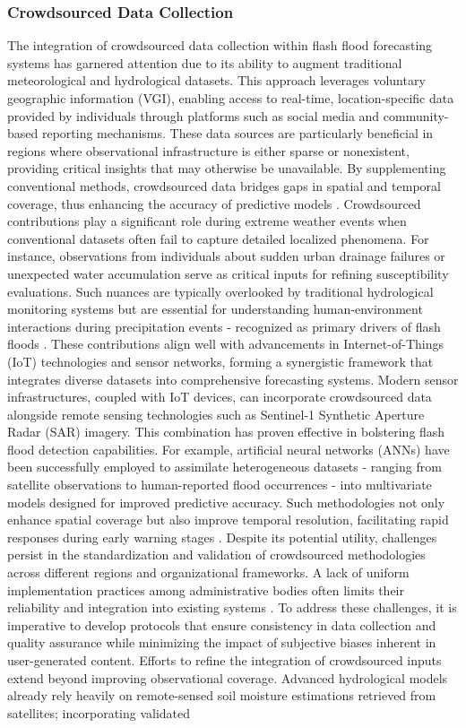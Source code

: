 \subsubsection{Crowdsourced Data Collection}
The integration of crowdsourced data collection within flash flood forecasting systems has garnered attention due to its ability to augment traditional meteorological and hydrological datasets. This approach leverages voluntary geographic information (VGI), enabling access to real-time, location-specific data provided by individuals through platforms such as social media and community-based reporting mechanisms. These data sources are particularly beneficial in regions where observational infrastructure is either sparse or nonexistent, providing critical insights that may otherwise be unavailable. By supplementing conventional methods, crowdsourced data bridges gaps in spatial and temporal coverage, thus enhancing the accuracy of predictive models \citep{Lowrie2022}. Crowdsourced contributions play a significant role during extreme weather events when conventional datasets often fail to capture detailed localized phenomena. For instance, observations from individuals about sudden urban drainage failures or unexpected water accumulation serve as critical inputs for refining susceptibility evaluations. Such nuances are typically overlooked by traditional hydrological monitoring systems but are essential for understanding human-environment interactions during precipitation events - recognized as primary drivers of flash floods \citep{Zhang2022}. These contributions align well with advancements in Internet-of-Things (IoT) technologies and sensor networks, forming a synergistic framework that integrates diverse datasets into comprehensive forecasting systems. Modern sensor infrastructures, coupled with IoT devices, can incorporate crowdsourced data alongside remote sensing technologies such as Sentinel-1 Synthetic Aperture Radar (SAR) imagery. This combination has proven effective in bolstering flash flood detection capabilities. For example, artificial neural networks (ANNs) have been successfully employed to assimilate heterogeneous datasets - ranging from satellite observations to human-reported flood occurrences - into multivariate models designed for improved predictive accuracy. Such methodologies not only enhance spatial coverage but also improve temporal resolution, facilitating rapid responses during early warning stages \citep{Ngo2018}. Despite its potential utility, challenges persist in the standardization and validation of crowdsourced methodologies across different regions and organizational frameworks. A lack of uniform implementation practices among administrative bodies often limits their reliability and integration into existing systems \citep{Lowrie2022}. To address these challenges, it is imperative to develop protocols that ensure consistency in data collection and quality assurance while minimizing the impact of subjective biases inherent in user-generated content. Efforts to refine the integration of crowdsourced inputs extend beyond improving observational coverage. Advanced hydrological models already rely heavily on remote-sensed soil moisture estimations retrieved from satellites; incorporating validated 